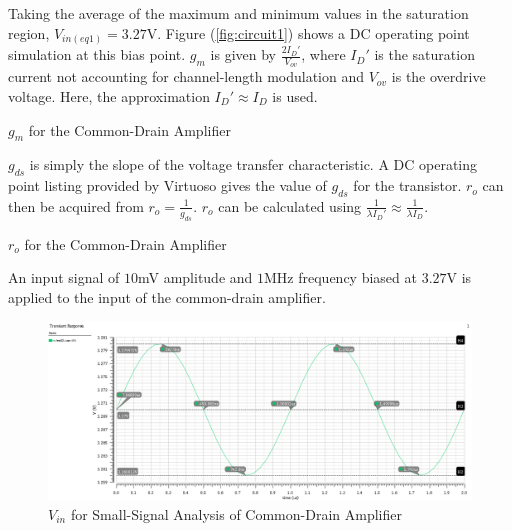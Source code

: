 Taking the average of the maximum and minimum values in the saturation region, $V_{in(eq1)} = 3.27$\si{\volt}.
Figure (\ref{fig:circuit1}) shows a DC operating point simulation at this bias point.
$g_{m}$ is given by $\frac{2I_{D}'}{V_{ov}}$, where $I_{D}'$ is the saturation current not accounting for channel-length modulation and $V_{ov}$ is the overdrive voltage.
Here, the approximation $I_{D}' \approx I_{D}$ is used.

\FloatBarrier

\begin{table}[h!]
	\centering
	\caption{$g_{m}$ for the Common-Drain Amplifier}
	\label{tab:common_drain_amp_gm}
\end{table}

\FloatBarrier

$g_{ds}$ is simply the slope of the voltage transfer characteristic.
A DC operating point listing provided by Virtuoso gives the value of $g_{ds}$ for the transistor.
$r_{o}$ can then be acquired from $r_{o} = \frac{1}{g_{ds}}$.
$r_{o}$ can be calculated using $\frac{1}{\lambda I_{D}'} \approx \frac{1}{\lambda I_{D}}$.

\FloatBarrier

\begin{table}[h!]
	\centering
	\caption{$r_{o}$ for the Common-Drain Amplifier}
	\label{tab:common_drain_amp_ro}
\end{table}

\FloatBarrier

An input signal of $10$\si{\milli\volt} amplitude and $1$\si{\mega\hertz} frequency biased at $3.27$\si{\volt} is applied to the input of the common-drain amplifier.

\FloatBarrier

\begin{figure}[h!]
	\centering
	\includegraphics[scale=0.45]{./images/sim1_vin.PNG}
	\caption{$V_{in}$ for Small-Signal Analysis of Common-Drain Amplifier}
	\label{fig:sim1_vin}
\end{figure}

